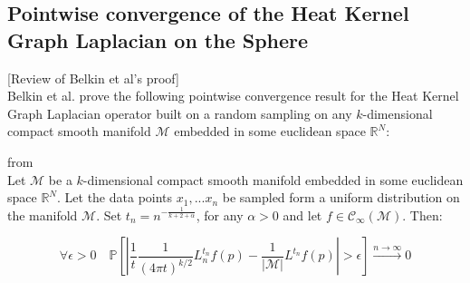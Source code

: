 \subsection{Pointwise convergence of the Heat Kernel Graph Laplacian on the Sphere}
\label{sec:pointwise convergence of the Heat Kernel Graph Laplacian on the Sphere}
[Review of Belkin et al's proof]\\ 
Belkin et al. prove the following pointwise convergence result for the Heat Kernel Graph Laplacian operator built on a random sampling on any $k$-dimensional compact smooth manifold $\mathcal M$ embedded in some euclidean space $\mathbb R^N$:
\vspace{0.5cm}
\begin{theorem}{from \cite[Belkin et al.]{Belkin:2005:TTF:2138147.2138189}}\\
	\label{theo:Belkin pointwise convergence}
	Let $\mathcal M$ be a $k$-dimensional compact smooth manifold embedded in some euclidean space $\mathbb R^N$. Let the data points $x_1, ... x_n$ be sampled form a uniform distribution on the manifold $\mathcal M$. Set $t_n=n^{-\frac{1}{k+2+\alpha}}$, for any $\alpha>0$ and let $f\in\mathcal C_\infty(\mathcal M)$. Then:
	
	$$\forall \epsilon>0\quad \mathbb{P}\left[\left|\frac{1}{t}\frac{1}{(4 \pi t)^{k/2}}L_{n}^{t_n} f(p)-  \frac{1}{|\mathcal M|}L^{t_n} f(p)\right|>\epsilon\right] \xrightarrow{n\to\infty} 0$$
\end{theorem}
\vspace{0.5cm}

